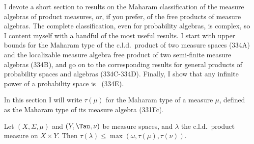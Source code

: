
\def\chaptername{Maharam's theorem}
\def\sectionname{Products}


I devote a short section to results on the Maharam classification of the
measure algebras of product measures, or, if you prefer, of the free
products of measure algebras.   The complete classification, even for
probability algebras, is complex, so I content
myself
with a handful of the most useful results.   I start with upper bounds
for the Maharam type of the c.l.d.\ product of two measure spaces (334A)
and the localizable measure algebra free product of two semi-finite
measure algebras (334B), and go on to the corresponding results for
general
products of probability spaces and algebras (334C-334D).   Finally, I
show that any infinite power of a probability space is \Mth\ (334E).

In this section I will write $\tau(\mu)$ for the Maharam type of a measure
$\mu$, defined as the Maharam type of its measure algebra (331Fc).

 Let $(X,\Sigma,\mu)$ and $(Y,\Tau,\nu)$
be measure spaces, and
$\lambda$ the c.l.d.\ product measure on $X\times Y$.
Then $\tau(\lambda)\le\max(\omega,\tau(\mu),\tau(\nu))$.

